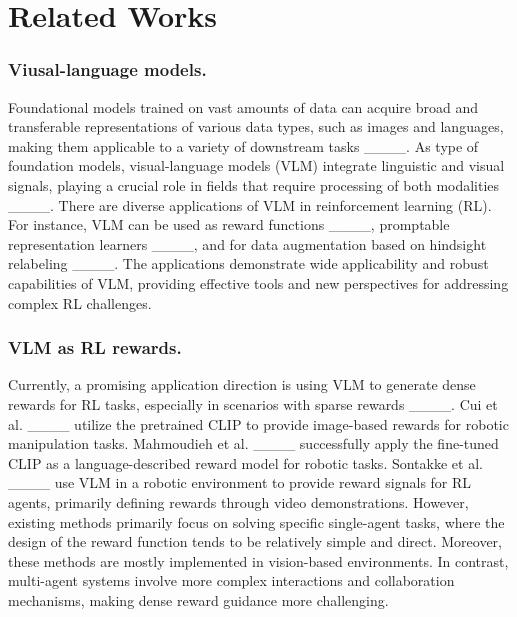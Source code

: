 \section{Related Works}
\subsubsection{Viusal-language models.}Foundational models trained on vast amounts of data can acquire broad and transferable representations of various data types, such as images and languages, making them applicable to a variety of downstream tasks ____. As type of foundation models, visual-language models (VLM) integrate linguistic and visual signals, playing a crucial role in fields that require processing of both modalities ____. There are diverse applications of VLM in reinforcement learning (RL). For instance, VLM can be used as reward functions ____, promptable representation learners ____, and for data augmentation based on hindsight relabeling ____. The applications demonstrate wide applicability and robust capabilities of VLM, providing effective tools and new perspectives for addressing complex RL challenges.

\subsubsection{VLM as RL rewards.}Currently, a promising application direction is using VLM to generate dense rewards for RL tasks, especially in scenarios with sparse rewards ____. Cui et al. ____ utilize the pretrained CLIP to provide image-based rewards for robotic manipulation tasks. Mahmoudieh et al. ____ successfully apply the fine-tuned CLIP as a language-described reward model for robotic tasks. Sontakke et al. ____ use VLM in a robotic environment to provide reward signals for RL agents, primarily defining rewards through video demonstrations. However, existing methods primarily focus on solving specific single-agent tasks, where the design of the reward function tends to be relatively simple and direct. Moreover, these methods are mostly implemented in vision-based environments. In contrast, multi-agent systems involve more complex interactions and collaboration mechanisms, making dense reward guidance more challenging.

